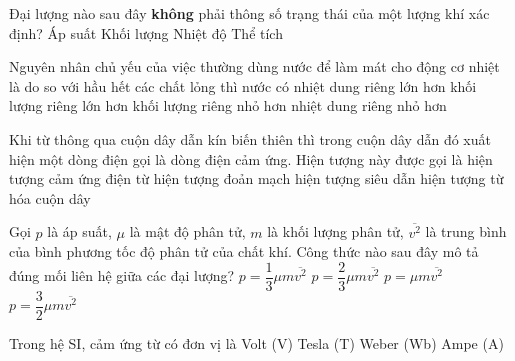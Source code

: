 	\begin{ex}%
		Đại lượng nào sau đây \textbf{không} phải thông số trạng thái của một lượng khí xác định?
		\choice
		{Áp suất}
		{\True Khối lượng}
		{Nhiệt độ}
		{Thể tích}
	\end{ex}

	\begin{ex}%
		Nguyên nhân chủ yếu của việc thường dùng nước để làm mát cho động cơ nhiệt là do so với hầu hết các chất lỏng thì nước có
		\choice
		{\True nhiệt dung riêng lớn hơn}
		{khối lượng riêng lớn hơn}
		{khối lượng riêng nhỏ hơn}
		{nhiệt dung riêng nhỏ hơn}
	\end{ex}

	\begin{ex}%
		Khi từ thông qua cuộn dây dẫn kín biến thiên thì trong cuộn dây dẫn đó xuất hiện một dòng điện gọi là dòng điện cảm ứng. Hiện tượng này được gọi là
		\choice
		{\True hiện tượng cảm ứng điện từ}
		{hiện tượng đoản mạch}
		{hiện tượng siêu dẫn}
		{hiện tượng từ hóa cuộn dây}
	\end{ex}

	\begin{ex}%
		Gọi $p$ là áp suất, $\mu$ là mật độ phân tử, $m$ là khối lượng phân tử, $\overline{v^2}$ là trung bình của bình phương tốc độ phân tử của chất khí. Công thức nào sau đây mô tả đúng mối liên hệ giữa các đại lượng?
		\choice
		{\True $p=\dfrac{1}{3}\mu m\overline{v^2}$}
		{$p=\dfrac{2}{3}\mu m\overline{v^2}$}
		{$p=\mu m\overline{v^2}$}
		{$p=\dfrac{3}{2}\mu m\overline{v^2}$}
	\end{ex}

	\begin{ex}%
		Trong hệ SI, cảm ứng từ có đơn vị là
		\choice
		{Volt (V)}
		{\True Tesla (T)}
		{Weber (Wb)}
		{Ampe (A)}
	\end{ex}

